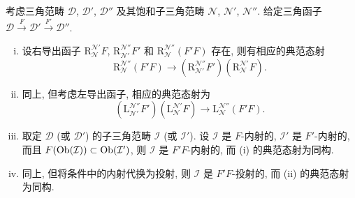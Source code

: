 \begin{theorem}\label{prop:localization-triangulated-composite}
	考虑三角范畴 $\mathcal{D}$, $\mathcal{D}'$, $\mathcal{D}''$ 及其饱和子三角范畴 $\mathcal{N}$, $\mathcal{N}'$, $\mathcal{N}''$. 给定三角函子 $\mathcal{D} \xrightarrow{F} \mathcal{D}' \xrightarrow{F'} \mathcal{D}''$.
	\begin{enumerate}[(i)]
		\item 设右导出函子 $\mathrm{R}^{\mathcal{N}'}_{\mathcal{N}} F$, $\mathrm{R}^{\mathcal{N}''}_{\mathcal{N}'} F'$ 和 $\mathrm{R}^{\mathcal{N}''}_{\mathcal{N}} (F' F)$ 存在, 则有相应的典范态射
		\[ \mathrm{R}^{\mathcal{N}''}_{\mathcal{N}} (F' F) \to \left( \mathrm{R}^{\mathcal{N}''}_{\mathcal{N}'} F' \right) \left( \mathrm{R}^{\mathcal{N}'}_{\mathcal{N}} F \right). \]
		\item 同上, 但考虑左导出函子, 相应的典范态射为
		\[ \left( \mathrm{L}^{\mathcal{N}''}_{\mathcal{N'}} F' \right) \left( \mathrm{L}^{\mathcal{N}'}_{\mathcal{N}} F \right) \to \mathrm{L}^{\mathcal{N}''}_{\mathcal{N}} (F' F). \]
		\item 取定 $\mathcal{D}$ (或 $\mathcal{D}'$) 的子三角范畴 $\mathcal{I}$ (或 $\mathcal{I}'$). 设 $\mathcal{I}$ 是 $F$-内射的, $\mathcal{I}'$ 是 $F'$-内射的, 而且 $F(\operatorname{Ob}(\mathcal{I})) \subset \operatorname{Ob}(\mathcal{I}')$, 则 $\mathcal{I}$ 是 $F'F$-内射的, 而 (i) 的典范态射为同构.
		\item 同上, 但将条件中的内射代换为投射, 则 $\mathcal{I}$ 是 $F'F$-投射的, 而 (ii) 的典范态射为同构.
	\end{enumerate}
\end{theorem}
